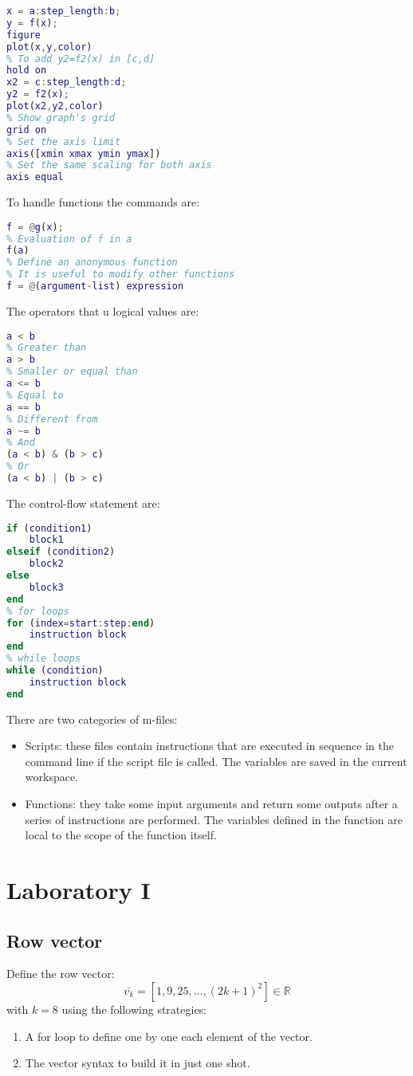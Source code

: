 \documentclass[12pt, a4paper]{report}
\newtheorem[style=M,bodystyle=\normalfont]{theorem}{Theorem}
\newtheorem[style=M,bodystyle=\normalfont]{corollary}{Corollary}
\newtheorem[style=M,bodystyle=\normalfont]{lemma}{Lemma}
\newtheorem[style=M,bodystyle=\normalfont]{definition}{Definition}
\begin{document}
    \begin{lstlisting}[language=Matlab]
% To plot y=f(x) in [a,b]
x = a:step_length:b;
y = f(x);   
figure         
plot(x,y,color)
% To add y2=f2(x) in [c,d]
hold on 
x2 = c:step_length:d;
y2 = f2(x);
plot(x2,y2,color)     
% Show graph's grid
grid on 
% Set the axis limit
axis([xmin xmax ymin ymax]) 
% Set the same scaling for both axis
axis equal 
    \end{lstlisting} 
    To handle functions the commands are: 
    \begin{lstlisting}[language=Matlab]
% Define a function handle to g(x)
f = @g(x);
% Evaluation of f in a
f(a) 
% Define an anonymous function
% It is useful to modify other functions
f = @(argument-list) expression
    \end{lstlisting} 
    The operators that u logical values are:  
    \begin{lstlisting}[language=Matlab]
% Smaller than
a < b     
% Greater than
a > b
% Smaller or equal than
a <= b   
% Equal to
a == b    
% Different from
a ~= b  
% And
(a < b) & (b > c)  
% Or   
(a < b) | (b > c)     
    \end{lstlisting} 
    The control-flow statement are: 
    \begin{lstlisting}[language=Matlab]
% if-then-else statements
if (condition1)
    block1
elseif (condition2)
    block2
else
    block3
end
% for loops
for (index=start:step:end)
    instruction block
end
% while loops
while (condition)
    instruction block
end
    \end{lstlisting}    
    There are two categories of m-files: 
    \begin{itemize}
        \item Scripts: these files contain instructions that are executed in sequence in the command line if the script file is called. 
            The variables are saved in the current workspace.
        \item Functions: they take some input arguments and return some outputs after a series of instructions are performed. 
            The variables defined in the function are local to the scope of the function itself.
    \end{itemize}

\newpage

\chapter{Laboratory I}
    \section{Row vector}
        Define the row vector: 
        \[ \bar{v_k} = [1,9,25,\dots,\left( 2k+1 \right)^2] \in \mathbb{R} \]
        with $k=8$ using the following strategies:
        \begin{enumerate}
            \item A for loop to define one by one each element of the vector.
            \item The vector syntax to build it in just one shot.
        \end{enumerate}
\end{document}
